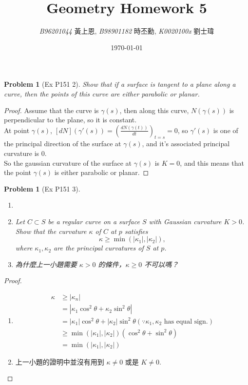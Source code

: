 \documentclass[10pt,a4paper]{article}
\newcommand{\LiHei}{\CJKfamily{lh}}
\newcounter{theProblemCounter}
\newtheorem{problem}[theProblemCounter]{Problem}
\begin{document}
\title{{Geometry Homework 5}}
\author{{\it{B96201044}} {\LiHei 黃上恩}, {\it{B98901182}} {\LiHei 時丕勳}, {\it{K0020100x}} {\LiHei 劉士瑋}}
\date{\today}
\maketitle

\newcommand{\bx}{\mathbb{X}}
\setcounter{theProblemCounter}{0}
\begin{problem}[Ex P151 2]
Show that if a surface is tangent to a plane along a curve, then the points of this curve are either parabolic or planar.
\end{problem}
\begin{proof}
Assume that the curve is $\gamma(s)$, then along this curve, $N(\gamma(s))$ is perpendicular to the plane, so it is constant.\\
At point $\gamma(s)$, $[dN](\gamma'(s))=\left(\frac{d N(\gamma(t))}{dt}\right)_{t=s}=0$, so $\gamma'(s)$ is one of the principal direction of the surface at $\gamma(s)$, and it's associated principal curvature is $0$.\\
So the gaussian curvature of the surface at $\gamma(s)$ is $K=0$, and this means that the point $\gamma(s)$ is either parabolic or planar.
\end{proof}

\setcounter{theProblemCounter}{2}
\begin{problem}[Ex P151 3]
\begin{enumerate}
\item[]
\item[(a)] Let $C\subset S$ be a regular curve on a surface $S$ with Gaussian curvature $K > 0$. Show that the curvature $\kappa$ of $C$ at $p$ satisfies \[ \kappa\ge \min(|\kappa_1|, |\kappa_2|),\] where $\kappa_1, \kappa_2$ are the principal curvatures of $S$ at $p$.
\item[(b)] 為什麼上一小題需要 $\kappa>0$ 的條件，$\kappa\ge 0$ 不可以嗎？ %
\end{enumerate}
\end{problem}
\begin{proof}
\begin{enumerate}
\item[(a)]
\begin{align*}
\kappa&\ge |\kappa_n|\\
&=|\kappa_1\cos^2\theta+\kappa_2\sin^2\theta|\\
&=|\kappa_1|\cos^2\theta+|\kappa_2|\sin^2\theta (\because\kappa_1, \kappa_2\textrm{ has equal sign.})\\
&\ge \min(|\kappa_1|, |\kappa_2|)(\cos^2\theta+\sin^2\theta)\\
&=\min(|\kappa_1|, |\kappa_2|)
\end{align*}
\item[(b)]
上一小題的證明中並沒有用到 $\kappa\neq 0$ 或是 $K\neq 0$.
\end{enumerate}
\end{proof}
\end{document}
